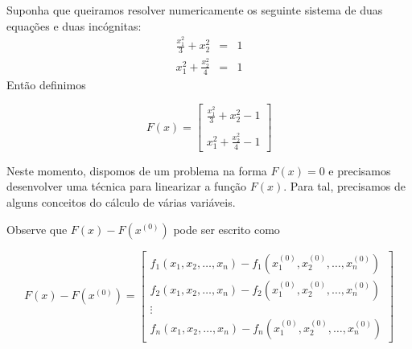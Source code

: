 \begin{ex} Suponha que queiramos resolver numericamente os seguinte sistema de duas equações e duas incógnitas:
\begin{eqnarray*}
\frac{x_1^2}{3}+x_2^2&=&1\\
x_1^2+\frac{x_2^2}{4}&=&1
\end{eqnarray*}
Então definimos

$$F(x)=\left[
\begin{array}{c}
\frac{x_1^2}{3}+x_2^2-1\\~\\
x_1^2+\frac{x_2^2}{4}-1
\end{array}
\right]$$
\end{ex}
Neste momento, dispomos de um problema na forma $F(x)=0$ e precisamos desenvolver uma técnica para linearizar a função $F(x)$. Para tal, precisamos de alguns conceitos do cálculo de várias variáveis.

Observe que $F(x)-F(x^{(0)})$ pode ser escrito como

$$F(x)-F(x^{(0)})=\left[
\begin{array}{c}
f_1(x_1,x_2,\ldots,x_n)-f_1(x_1^{(0)},x_2^{(0)},\ldots,x_n^{(0)})\\
f_2(x_1,x_2,\ldots,x_n)-f_2(x_1^{(0)},x_2^{(0)},\ldots,x_n^{(0)})\\
\vdots\\
f_n(x_1,x_2,\ldots,x_n)-f_n(x_1^{(0)},x_2^{(0)},\ldots,x_n^{(0)})
\end{array}
\right]$$

